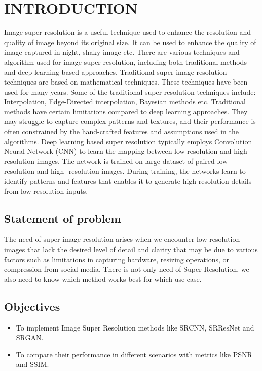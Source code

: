 \newpage
{}
\section{INTRODUCTION}
Image super resolution is a useful technique used to enhance the resolution and quality of
image beyond its original size. It
can be used to enhance the quality of image captured in night, shaky image etc. There
are various techniques and algorithm used for image super resolution, including both
traditional methods and deep learning-based approaches. Traditional super image
resolution techniques are based on mathematical techniques. These techniques have
been used for many years. Some of the traditional super resolution techniques include:
Interpolation, Edge-Directed interpolation, Bayesian methods etc. Traditional methods
have certain limitations compared to deep learning approaches. They may struggle to
capture complex patterns and textures, and their performance is often constrained by
the hand-crafted features and assumptions used in the algorithms.
Deep learning based super resolution typically employs Convolution Neural
Network (CNN) to learn the mapping between low-resolution and high-resolution
images. The network is trained on large dataset of paired low-resolution and high-
resolution images. During training, the networks learn to identify patterns and features
that enables it to generate high-resolution details from low-resolution inputs.


\subsection{Statement of problem}
The need of super image resolution arises when we encounter low-resolution images
that lack the desired level of detail and clarity that may be due to various factors such as limitations in capturing hardware, resizing
operations, or compression from social media. There is not only need of Super Resolution, we also need to know which method works best for which use case.

\subsection{Objectives} 
\begin{itemize}
    \item To implement Image Super Resolution methods like SRCNN, SRResNet and SRGAN.
    \item To compare their performance in different scenarios with metrics like PSNR and SSIM.
\end{itemize}

